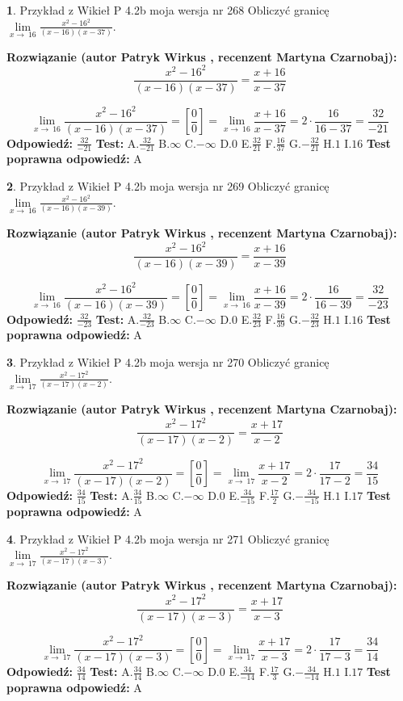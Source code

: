 \documentclass[12pt, a4paper]{article}
\theoremstyle{definition} %
\newtheorem{zad}{}
\newcommand{\zadStart}[1]{\begin{zad}#1\newline}
\newcommand{\zadStop}{\end{zad}}
\newcommand{\rozwStart}[2]{\noindent \textbf{Rozwiązanie (autor #1 , recenzent #2): }\newline}
\newcommand{\rozwStop}{\newline}
\newcommand{\odpStart}{\noindent \textbf{Odpowiedź:}\newline}
\newcommand{\odpStop}{\newline}
\newcommand{\testStart}{\noindent \textbf{Test:}\newline}
\newcommand{\testStop}{\newline}
\newcommand{\kluczStart}{\noindent \textbf{Test poprawna odpowiedź:}\newline}
\newcommand{\kluczStop}{\newline}
\begin{document}
\zadStart{Przykład z Wikieł P 4.2b moja wersja nr 268}
Obliczyć granicę $\lim\limits_{x\to\ 16}\frac{x^{2}-16^{2}}{(x-16)(x-37)}$.
\zadStop
\rozwStart{Patryk Wirkus}{Martyna Czarnobaj}
$$\frac{x^{2}-16^{2}}{(x-16)(x-37)}=\frac{x+16}{x-37}$$

$$\lim\limits_{x\to\ 16}\frac{x^{2}-16^{2}}{(x-16)(x-37)}=[\frac{0}{0}]=\lim\limits_{x\to\ 16}\frac{x+16}{x-37}=2 \cdot \frac{16}{16-37} = \frac{32}{-21}$$
\rozwStop
\odpStart
$\frac{32}{-21}$
\odpStop
\testStart
A.$\frac{32}{-21}$
B.$\infty$
C.$-\infty$
D.$0$
E.$\frac{32}{21}$
F.$\frac{16}{37}$
G.$-\frac{32}{21}$
H.$1$
I.$16$
\testStop
\kluczStart
A
\kluczStop



\zadStart{Przykład z Wikieł P 4.2b moja wersja nr 269}
Obliczyć granicę $\lim\limits_{x\to\ 16}\frac{x^{2}-16^{2}}{(x-16)(x-39)}$.
\zadStop
\rozwStart{Patryk Wirkus}{Martyna Czarnobaj}
$$\frac{x^{2}-16^{2}}{(x-16)(x-39)}=\frac{x+16}{x-39}$$

$$\lim\limits_{x\to\ 16}\frac{x^{2}-16^{2}}{(x-16)(x-39)}=[\frac{0}{0}]=\lim\limits_{x\to\ 16}\frac{x+16}{x-39}=2 \cdot \frac{16}{16-39} = \frac{32}{-23}$$
\rozwStop
\odpStart
$\frac{32}{-23}$
\odpStop
\testStart
A.$\frac{32}{-23}$
B.$\infty$
C.$-\infty$
D.$0$
E.$\frac{32}{23}$
F.$\frac{16}{39}$
G.$-\frac{32}{23}$
H.$1$
I.$16$
\testStop
\kluczStart
A
\kluczStop



\zadStart{Przykład z Wikieł P 4.2b moja wersja nr 270}
Obliczyć granicę $\lim\limits_{x\to\ 17}\frac{x^{2}-17^{2}}{(x-17)(x-2)}$.
\zadStop
\rozwStart{Patryk Wirkus}{Martyna Czarnobaj}
$$\frac{x^{2}-17^{2}}{(x-17)(x-2)}=\frac{x+17}{x-2}$$

$$\lim\limits_{x\to\ 17}\frac{x^{2}-17^{2}}{(x-17)(x-2)}=[\frac{0}{0}]=\lim\limits_{x\to\ 17}\frac{x+17}{x-2}=2 \cdot \frac{17}{17-2} = \frac{34}{15}$$
\rozwStop
\odpStart
$\frac{34}{15}$
\odpStop
\testStart
A.$\frac{34}{15}$
B.$\infty$
C.$-\infty$
D.$0$
E.$\frac{34}{-15}$
F.$\frac{17}{2}$
G.$-\frac{34}{-15}$
H.$1$
I.$17$
\testStop
\kluczStart
A
\kluczStop



\zadStart{Przykład z Wikieł P 4.2b moja wersja nr 271}
Obliczyć granicę $\lim\limits_{x\to\ 17}\frac{x^{2}-17^{2}}{(x-17)(x-3)}$.
\zadStop
\rozwStart{Patryk Wirkus}{Martyna Czarnobaj}
$$\frac{x^{2}-17^{2}}{(x-17)(x-3)}=\frac{x+17}{x-3}$$

$$\lim\limits_{x\to\ 17}\frac{x^{2}-17^{2}}{(x-17)(x-3)}=[\frac{0}{0}]=\lim\limits_{x\to\ 17}\frac{x+17}{x-3}=2 \cdot \frac{17}{17-3} = \frac{34}{14}$$
\rozwStop
\odpStart
$\frac{34}{14}$
\odpStop
\testStart
A.$\frac{34}{14}$
B.$\infty$
C.$-\infty$
D.$0$
E.$\frac{34}{-14}$
F.$\frac{17}{3}$
G.$-\frac{34}{-14}$
H.$1$
I.$17$
\testStop
\kluczStart
A
\kluczStop
\end{document}
